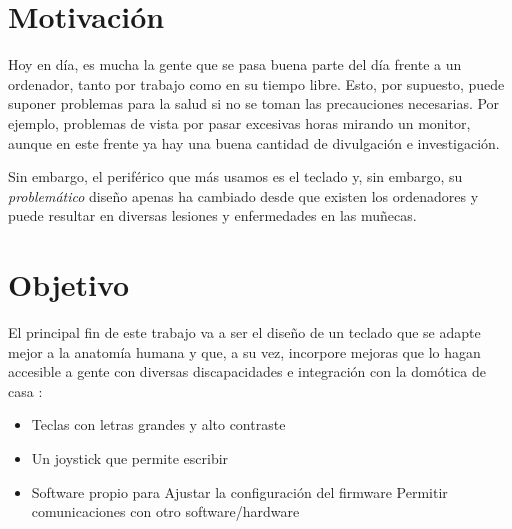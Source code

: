 \section{Motivación}
Hoy en día, es mucha la gente que se pasa buena parte del día frente a un ordenador, tanto por trabajo como en su tiempo libre. Esto, por supuesto, puede suponer problemas para la salud si no se toman las precauciones necesarias. Por ejemplo, problemas de vista por pasar excesivas horas mirando un monitor, aunque en este frente ya hay una buena cantidad de divulgación e investigación.

Sin embargo, el periférico que más usamos es el teclado y, sin embargo, su \emph{problemático} diseño apenas ha cambiado desde que existen los ordenadores y puede resultar en diversas lesiones y enfermedades en las muñecas.

\section{Objetivo}
El principal fin de este trabajo va a ser el diseño de un teclado que se adapte mejor a la anatomía humana y que, a su vez, incorpore mejoras que lo hagan accesible a gente con diversas discapacidades e integración con la domótica de casa :
\begin{itemize}
  \item Teclas con letras grandes y alto contraste
  \item Un joystick que permite escribir
  \item Software propio para
    \subitem Ajustar la configuración del firmware
    \subitem Permitir comunicaciones con otro software/hardware
\end{itemize}
